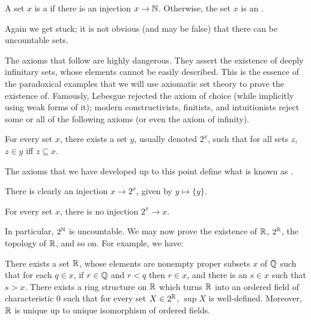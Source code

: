 \begin{definition}
A set $x$ is a  if there is an injection $x \to \mathbb{N}$.
Otherwise, the set $x$ is an .
\end{definition}

\begin{subsec}
Again we get stuck; it is not obvious (and may be false) that there can be uncountable sets.
\end{subsec}

\begin{subsec}
The axioms that follow are highly dangerous. They assert the existence of deeply infinitary sets, whose elements cannot be easily described.
This is the essence of the paradoxical examples that we will use axiomatic set theory to prove the existence of.
Famously, Lebesgue rejected the axiom of choice (while implicitly using weak forms of it); modern constructivists, finitists, and intuitionists reject some or all of the following axioms (or even the axiom of infinity).
\end{subsec}

\begin{axiom}
For every set $x$, there exists a set $y$, usually denoted $2^{x}$, such that for all sets $z$, $z \in y$ iff $z \subseteq x$.
\end{axiom}

\begin{subsec}
The axioms that we have developed up to this point define what is known as .
\end{subsec}

\begin{subsec}
There is clearly an injection $x \to 2^{x}$, given by $y \mapsto \{y\}$.
\end{subsec}

\begin{theorem}
For every set $x$, there is no injection $2^{x} \to x$.
\end{theorem}

\begin{subsec}
In particular, $2^{\mathbb{N}}$ is uncountable.
We may now prove the existence of $\mathbb{R}$, $2^{\mathbb{R}}$, the topology of $\mathbb{R}$, and so on. For example, we have:
\end{subsec}

\begin{theorem}[Dedekind]
There exists a set $\mathbb{R}$, whose elements are nonempty proper subsets $x$ of $\mathbb{Q}$ such that for each $q \in x$, if $r \in \mathbb{Q}$ and $r < q$ then $r \in x$, and there is an $s \in x$ such that $s > x$.
There exists a ring structure on $\mathbb{R}$ which turns $\mathbb{R}$ into an ordered field of characteristic $0$ such that for every set $X \in 2^{\mathbb{R}}$, $\sup X$ is well-defined.
Moreover, $\mathbb{R}$ is unique up to unique isomorphism of ordered fields.
\end{theorem}


